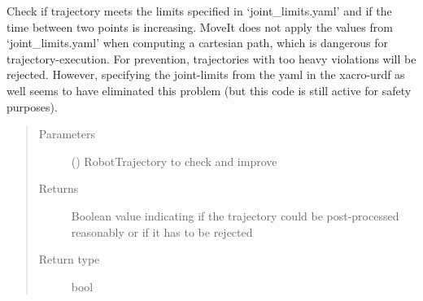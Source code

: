 \documentclass[letterpaper,10pt,english]{sphinxmanual}
\begin{document}
\begin{fulllineitems}

\begin{fulllineitems}
\label{\detokenize{module_trajectory_manager:agiprobot_measurement.trajectory_manager.TrajectoryManager.postprocess_trajectory}}
Check if trajectory meets the limits specified in ‘joint\_limits.yaml’ and if the time between two points is increasing.
MoveIt does not apply the values from ‘joint\_limits.yaml’ when computing a cartesian path, which is dangerous for trajectory-execution.
For prevention, trajectories with too heavy violations will be rejected. However, specifying the joint-limits from the yaml in the xacro-urdf as
well seems to have eliminated this problem (but this code is still active for safety purposes).
\begin{quote}\begin{description}
\item[{Parameters}] \leavevmode
{} () \textendash{} RobotTrajectory to check and improve

\item[{Returns}] \leavevmode
Boolean value indicating if the trajectory could be post-processed reasonably or if it has to be rejected

\item[{Return type}] \leavevmode
bool

\end{description}\end{quote}

\end{fulllineitems}



\end{fulllineitems}
\end{document}
